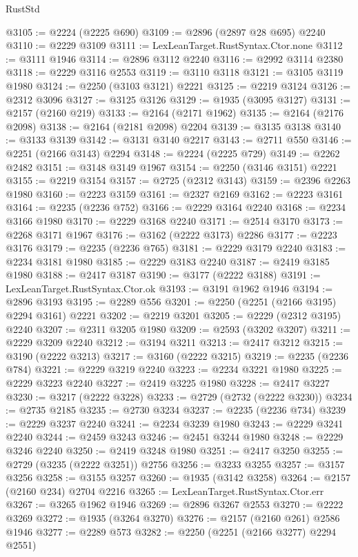 \begin{lexlean}{RustStd}
\begin{coremodule}
{\begin{coremodule}
{{{{{{{{{{{{{{{{{{{{{{{{{{{{{{{{{{{{{{{{{{{{{{{{{{{{{@3105 := @2224 (@2225 @690)
@3109 := @2896 (@2897 @28 @695) @2240
@3110 := @2229 @3109
@3111 := LexLeanTarget.RustSyntax.Ctor.none
@3112 := @3111 @1946
@3114 := @2896 @3112 @2240
@3116 := @2992 @3114 @2380
@3118 := @2229 @3116 @2553
@3119 := @3110 @3118
@3121 := @3105 @3119 @1980
@3124 := @2250 (@3103 @3121) @2221
@3125 := @2219 @3124
@3126 := @2312 @3096
@3127 := @3125 @3126
@3129 := @1935 (@3095 @3127)
@3131 := @2157 (@2160 @219)
@3133 := @2164 (@2171 @1962)
@3135 := @2164 (@2176 @2098)
@3138 := @2164 (@2181 @2098) @2204
@3139 := @3135 @3138
@3140 := @3133 @3139
@3142 := @3131 @3140 @2217
@3143 := @2711 @550
@3146 := @2251 (@2166 @3143) @2294
@3148 := @2224 (@2225 @729)
@3149 := @2262 @2482
@3151 := @3148 @3149 @1967
@3154 := @2250 (@3146 @3151) @2221
@3155 := @2219 @3154
@3157 := @2725 (@2312 @3143)
@3159 := @2396 @2263 @1980
@3160 := @2223 @3159
@3161 := @2327 @2169
@3162 := @2223 @3161
@3164 := @2235 (@2236 @752)
@3166 := @2229 @3164 @2240
@3168 := @2234 @3166 @1980
@3170 := @2229 @3168 @2240
@3171 := @2514 @3170
@3173 := @2268 @3171 @1967
@3176 := @3162 (@2222 @3173) @2286
@3177 := @2223 @3176
@3179 := @2235 (@2236 @765)
@3181 := @2229 @3179 @2240
@3183 := @2234 @3181 @1980
@3185 := @2229 @3183 @2240
@3187 := @2419 @3185 @1980
@3188 := @2417 @3187
@3190 := @3177 (@2222 @3188)
@3191 := LexLeanTarget.RustSyntax.Ctor.ok
@3193 := @3191 @1962 @1946
@3194 := @2896 @3193
@3195 := @2289 @556
@3201 := @2250 (@2251 (@2166 @3195) @2294 @3161) @2221
@3202 := @2219 @3201
@3205 := @2229 (@2312 @3195) @2240
@3207 := @2311 @3205 @1980
@3209 := @2593 (@3202 @3207)
@3211 := @2229 @3209 @2240
@3212 := @3194 @3211
@3213 := @2417 @3212
@3215 := @3190 (@2222 @3213)
@3217 := @3160 (@2222 @3215)
@3219 := @2235 (@2236 @784)
@3221 := @2229 @3219 @2240
@3223 := @2234 @3221 @1980
@3225 := @2229 @3223 @2240
@3227 := @2419 @3225 @1980
@3228 := @2417 @3227
@3230 := @3217 (@2222 @3228)
@3233 := @2729 (@2732 (@2222 @3230))
@3234 := @2735 @2185
@3235 := @2730 @3234
@3237 := @2235 (@2236 @734)
@3239 := @2229 @3237 @2240
@3241 := @2234 @3239 @1980
@3243 := @2229 @3241 @2240
@3244 := @2459 @3243
@3246 := @2451 @3244 @1980
@3248 := @2229 @3246 @2240
@3250 := @2419 @3248 @1980
@3251 := @2417 @3250
@3255 := @2729 (@3235 (@2222 @3251)) @2756
@3256 := @3233 @3255
@3257 := @3157 @3256
@3258 := @3155 @3257
@3260 := @1935 (@3142 @3258)
@3264 := @2157 (@2160 @234) @2704 @2216
@3265 := LexLeanTarget.RustSyntax.Ctor.err
@3267 := @3265 @1962 @1946
@3269 := @2896 @3267 @2553
@3270 := @2222 @3269
@3272 := @1935 (@3264 @3270)
@3276 := @2157 (@2160 @261) @2586 @1946
@3277 := @2289 @573
@3282 := @2250 (@2251 (@2166 @3277) @2294 @2551)
}}}}}}}}}}}}}}}}}}}}}}}}}}}}}}}}}}}}}}}}}}}}}}}}}}}}}
\end{coremodule}}
\end{coremodule}
\end{lexlean}
